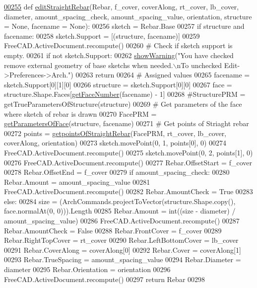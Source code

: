 \begin{DoxyCode}
\hypertarget{namespaceStraightRebar.tex_l00255}{}\hyperlink{namespaceStraightRebar_ab4c578165b01dd7c7d121e5345de2d7b}{00255} \textcolor{keyword}{def }\hyperlink{namespaceStraightRebar_ab4c578165b01dd7c7d121e5345de2d7b}{editStraightRebar}(Rebar, f\_cover, coverAlong, rt\_cover, lb\_cover, diameter, 
      amount\_spacing\_check, amount\_spacing\_value, orientation, structure = None, facename = None):
00256     sketch = Rebar.Base
00257     \textcolor{keywordflow}{if} structure \textcolor{keywordflow}{and} facename:
00258         sketch.Support = [(structure, facename)]
00259         FreeCAD.ActiveDocument.recompute()
00260     \textcolor{comment}{# Check if sketch support is empty.}
00261     \textcolor{keywordflow}{if} \textcolor{keywordflow}{not} sketch.Support:
00262         \hyperlink{namespaceRebarfunc_a2278a0602d46a62953af1fcf2e574a94}{showWarning}(\textcolor{stringliteral}{"You have checked remove external geometry of base sketchs when needed.\(\backslash\)nTo
       unchecked Edit->Preferences->Arch."})
00263         \textcolor{keywordflow}{return}
00264     \textcolor{comment}{# Assigned values}
00265     facename = sketch.Support[0][1][0]
00266     structure = sketch.Support[0][0]
00267     face = structure.Shape.Faces[\hyperlink{namespaceRebarfunc_a3885b3b63e3a41508ac79bc7550cf301}{getFaceNumber}(facename) - 1]
00268     \textcolor{comment}{#StructurePRM = getTrueParametersOfStructure(structure)}
00269     \textcolor{comment}{# Get parameters of the face where sketch of rebar is drawn}
00270     FacePRM = \hyperlink{namespaceRebarfunc_a92122b3d7cedd3d47bb63380a5ac4d08}{getParametersOfFace}(structure, facename)
00271     \textcolor{comment}{# Get points of Striaght rebar}
00272     points = \hyperlink{namespaceStraightRebar_a1873c6f7f59b355a64fdd966ad75f778}{getpointsOfStraightRebar}(FacePRM, rt\_cover, lb\_cover, coverAlong, 
      orientation)
00273     sketch.movePoint(0, 1, points[0], 0)
00274     FreeCAD.ActiveDocument.recompute()
00275     sketch.movePoint(0, 2, points[1], 0)
00276     FreeCAD.ActiveDocument.recompute()
00277     Rebar.OffsetStart = f\_cover
00278     Rebar.OffsetEnd = f\_cover
00279     \textcolor{keywordflow}{if} amount\_spacing\_check:
00280         Rebar.Amount = amount\_spacing\_value
00281         FreeCAD.ActiveDocument.recompute()
00282         Rebar.AmountCheck = \textcolor{keyword}{True}
00283     \textcolor{keywordflow}{else}:
00284         size = (ArchCommands.projectToVector(structure.Shape.copy(), face.normalAt(0, 0))).Length
00285         Rebar.Amount = int((size - diameter) / amount\_spacing\_value)
00286         FreeCAD.ActiveDocument.recompute()
00287         Rebar.AmountCheck = \textcolor{keyword}{False}
00288     Rebar.FrontCover = f\_cover
00289     Rebar.RightTopCover = rt\_cover
00290     Rebar.LeftBottomCover = lb\_cover
00291     Rebar.CoverAlong = coverAlong[0]
00292     Rebar.Cover = coverAlong[1]
00293     Rebar.TrueSpacing = amount\_spacing\_value
00294     Rebar.Diameter = diameter
00295     Rebar.Orientation = orientation
00296     FreeCAD.ActiveDocument.recompute()
00297     \textcolor{keywordflow}{return} Rebar
00298 
\end{DoxyCode}


